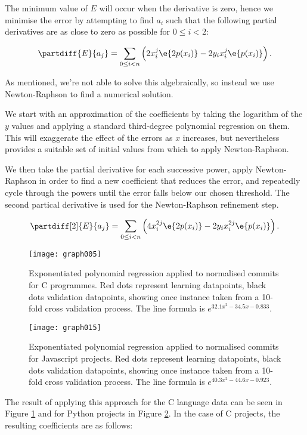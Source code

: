\documentclass[10pt,journal,compsoc]{IEEEtran}
\begin{document}
The minimum value of $E$ will occur when the derivative is zero, hence we minimise the error by attempting to find $a_i$ such that the following partial derivatives are as close to zero as possible for $0 \le i < 2$:

$$
\partdiff{E}{a_j} = \sum_{0 \le i < n} \left( 2 x_i^j \e{2 p(x_i)} - 2 y_i x_i^j \e{p(x_i)} \right) .
$$

As mentioned, we're not able to solve this algebraically, so instead we use Newton-Raphson to find a numerical solution.


We start with an approximation of the coefficients by taking the logarithm of the $y$ values and applying a standard third-degree polynomial regression on them. This will exaggerate the effect of the errors as $x$ increases, but nevertheless provides a suitable set of initial values from which to apply Newton-Raphson.

We then take the partial derivative for each successive power, apply Newton-Raphson in order to find a new coefficient that reduces the error, and repeatedly cycle through the powers until the error falls below our chosen threshold. The second partical derivative is used for the Newton-Raphson refinement step.

$$
\partdiff[2]{E}{a_j} = \sum_{0 \le i < n} \left( 4 x_i^{2j} \e{2 p(x_i)} - 2 y_i x_i^{2j} \e{p(x_i)} \right) .
$$

\begin{figure}[t]
\centering
\texttt{[image: graph005]}%
\caption{\label{fig:c-exp}Exponentiated polynomial regression applied to normalised commits for C programmes. Red dots represent learning datapoints, black dots validation datapoints, showing once instance taken from a 10-fold cross validation process. The line formula is $e^{32.1x^{2} - 34.5x - 0.833}$.}
\end{figure}

\begin{figure}[t]
\centering
\texttt{[image: graph015]}%
\caption{\label{fig:javascript-exp}Exponentiated polynomial regression applied to normalised commits for Javascript projects. Red dots represent learning datapoints, black dots validation datapoints, showing once instance taken from a 10-fold cross validation process. The line formula is $e^{40.3x^{2} - 44.6x - 0.923}$.}
\end{figure}

The result of applying this approach for the C language data can be seen in Figure \ref{fig:c-exp} and for Python projects in Figure \ref{fig:javascript-exp}. In the case of C projects, the resulting coefficients are as follows:
\end{document}
